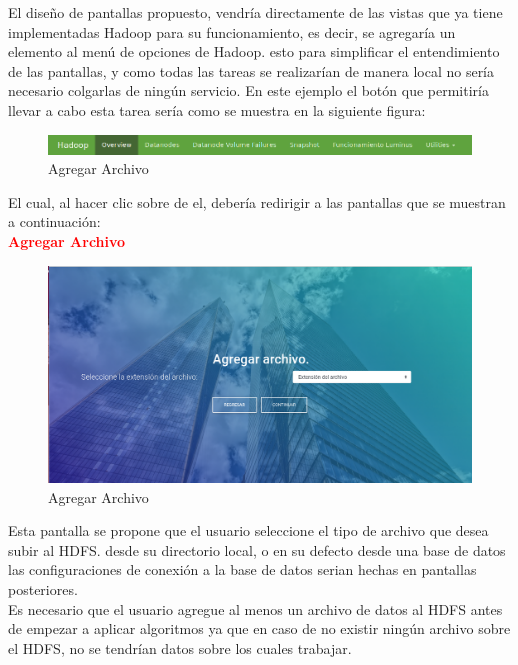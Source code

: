 El diseño de pantallas propuesto, vendría directamente de las vistas que ya tiene implementadas Hadoop para su funcionamiento, es decir, se agregaría un elemento al menú de opciones de Hadoop. esto para simplificar el entendimiento de las pantallas, y como todas las tareas se realizarían de manera local no sería necesario colgarlas de ningún servicio. En este ejemplo el botón que permitiría llevar a cabo esta tarea sería  como se muestra en la siguiente figura:\\
\begin{figure}[H]
	\hypertarget{fig:red}{\hspace{1pt}}
	\begin{center}
		\includegraphics[width=.9\textwidth]{capitulo7/images/menu.png}
		\caption{Agregar Archivo}
		\label{fig:agre}
	\end{center}
\end{figure}
El cual, al hacer clic sobre de el, debería redirigir a las pantallas que se muestran a continuación:
\\
\textbf{\textcolor{red}{Agregar Archivo}}
\begin{figure}[H]
	\hypertarget{fig:red}{\hspace{1pt}}
	\begin{center}
		\includegraphics[width=.9\textwidth]{capitulo7/images/AgregarArchivo.png}
		\caption{Agregar Archivo}
		\label{fig:agre}
	\end{center}
\end{figure}
Esta pantalla se propone que el usuario seleccione el tipo de archivo que desea subir al HDFS. desde su directorio local, o en su defecto desde una base de datos las configuraciones de conexión a la base de datos serian hechas en pantallas posteriores.\\
Es necesario que el usuario agregue al menos un archivo de datos al HDFS antes de empezar a aplicar algoritmos ya que en caso de no existir ningún archivo sobre el HDFS, no se tendrían datos sobre los cuales trabajar.\\
